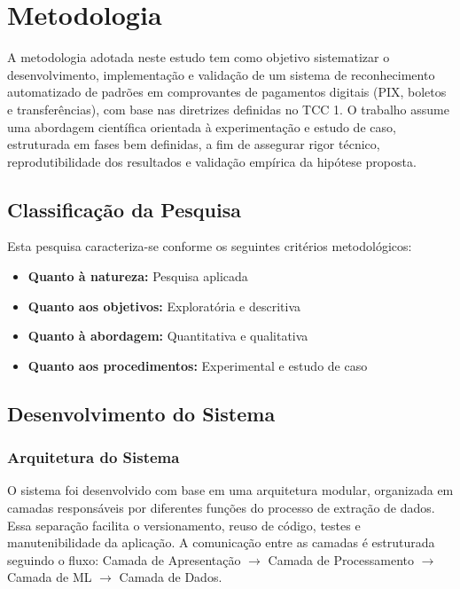 \chapter{Metodologia}
\label{chap:metodologia}

A metodologia adotada neste estudo tem como objetivo sistematizar o desenvolvimento, implementação e validação de um sistema de reconhecimento automatizado de padrões em comprovantes de pagamentos digitais (PIX, boletos e transferências), com base nas diretrizes definidas no TCC 1. O trabalho assume uma abordagem científica orientada à experimentação e estudo de caso, estruturada em fases bem definidas, a fim de assegurar rigor técnico, reprodutibilidade dos resultados e validação empírica da hipótese proposta.

\section{Classificação da Pesquisa}

Esta pesquisa caracteriza-se conforme os seguintes critérios metodológicos:

\begin{itemize}
    \item \textbf{Quanto à natureza:} Pesquisa aplicada
    \item \textbf{Quanto aos objetivos:} Exploratória e descritiva
    \item \textbf{Quanto à abordagem:} Quantitativa e qualitativa
    \item \textbf{Quanto aos procedimentos:} Experimental e estudo de caso
\end{itemize}

\section{Desenvolvimento do Sistema}

\subsection{Arquitetura do Sistema}

O sistema foi desenvolvido com base em uma arquitetura modular, organizada em camadas responsáveis por diferentes funções do processo de extração de dados. Essa separação facilita o versionamento, reuso de código, testes e manutenibilidade da aplicação. A comunicação entre as camadas é estruturada seguindo o fluxo: Camada de Apresentação $\rightarrow$ Camada de Processamento $\rightarrow$ Camada de ML $\rightarrow$ Camada de Dados.


